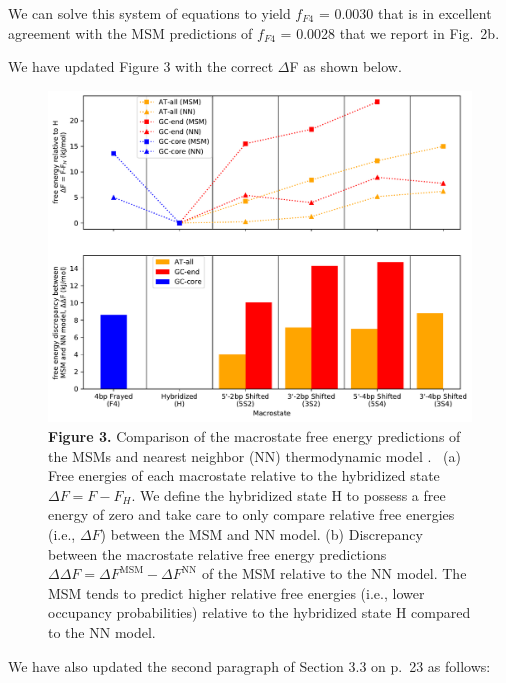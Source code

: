 \documentclass[11pt,a4paper]{letter} %
\newcommand*{\rood}[1]{{\color{red}{#1}}}
\begin{document}
We can solve this system of equations to yield $f_{F4}$ = 0.0030 that is in excellent agreement with the MSM predictions of $f_{F4}$ = 0.0028 that we report in Fig.~2b. 

We have updated Figure 3 with the correct $\Delta$F as shown below.

\begin{figure}[ht!]
	\begin{center} 
        \includegraphics[width=140mm, scale=1]{../Fig3.pdf}
        \caption*{\textbf{Figure 3.} Comparison of the macrostate free energy predictions of the MSMs and nearest neighbor (NN) thermodynamic model \rood{at the sequence melting temperatures}.~\citep{SantaLucia1998AThermodynamics, Santalucia2004TheMotifs} (a) Free energies of each macrostate relative to the hybridized state $\Delta F = F - F_H$. We define the hybridized state H to possess a free energy of zero and take care to only compare relative free energies (i.e., $\Delta F$) between the MSM and NN model. (b) Discrepancy between the macrostate relative free energy predictions $\Delta \Delta F = \Delta F^\mathrm{MSM} - \Delta F^\mathrm{NN}$ of the MSM relative to the NN model. The MSM tends to predict higher relative free energies (i.e., lower occupancy probabilities) relative to the hybridized state H compared to the NN model.}
        \label{fig:NN_table}
	\end{center}
\end{figure}

We have also updated the second paragraph of Section 3.3 on p.~23 as follows:
\end{document}
